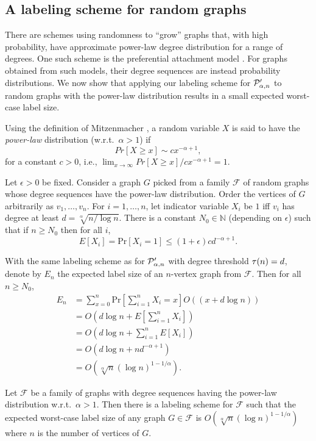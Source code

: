 \subsection{A labeling scheme for random graphs}
There are schemes using randomness to ``grow''  graphs that, with high probability, have approximate power-law degree distribution for a range of degrees. One such scheme is the preferential attachment model \cite{barabasi1999emergence}. For graphs obtained from such models, their degree sequences are instead probability distributions. We now show that applying our labeling scheme for $ \mathcal{P}'_{\alpha,n}$ to random graphs with the power-law distribution results in a small expected worst-case label size.

Using the definition of Mitzenmacher \cite{mitzenmacher2004brief}, a random variable $X$ is said to have the \emph{power-law} distribution (w.r.t.~$\alpha > 1$) if
\[
  Pr[X\geq x] \sim cx^{-\alpha+1},
\]
for a constant $c > 0$, i.e., $\lim_{x\to\infty}Pr[X\geq x]/cx^{-\alpha+1} = 1$.

Let $\epsilon > 0$ be fixed. Consider a graph $G$ picked from a family $\mathcal F$ of random graphs whose degree sequences have the power-law distribution. Order the vertices of $G$ arbitrarily as $v_1,\ldots,v_n$. For $i=1,\ldots,n$, let indicator variable $X_i$ be $1$ iff $v_i$ has degree at least $d = \sqrt[\alpha]{n/\log n}$. There is a constant $N_0\in\mathbb N$ (depending on $\epsilon$) such that if $n\geq N_0$ then for all $i$,
\[
  E[X_i] = \mbox{Pr}[X_i = 1]\leq (1+\epsilon)cd^{-\alpha+1}.
\]

With the same labeling scheme as for $ \mathcal{P}'_{\alpha,n}$ with degree threshold $\tau(n) = d$, denote by $E_n$ the expected label size of an $n$-vertex graph from $\mathcal F$. Then for all $n\geq N_0$,
\begin{align*}
  E_n & = \sum_{x=0}^n \mbox{Pr}\left[\sum_{i=1}^n X_i = x\right]O((x+d\log n))\\
                       & = O\left(d\log n + E\left[\sum_{i=1}^n X_i\right]\right)\\
                       & = O\left(d\log n + \sum_{i=1}^n E[X_i]\right)\\
                       & = O\left(d\log n + nd^{-\alpha+1}\right)\\
                       & = O\left(\sqrt[\alpha]n(\log n)^{1-1/\alpha}\right).
\end{align*}
\begin{theorem}\label{th:random}
Let $\mathcal F$ be a family of graphs with degree sequences having the power-law distribution w.r.t.~$\alpha > 1$. Then there is a labeling scheme for $\mathcal F$ such that the expected worst-case label size of any graph $G\in\mathcal F$ is $O(\sqrt[\alpha]n(\log n)^{1-1/\alpha})$ where $n$ is the number of vertices of $G$.
\end{theorem}

